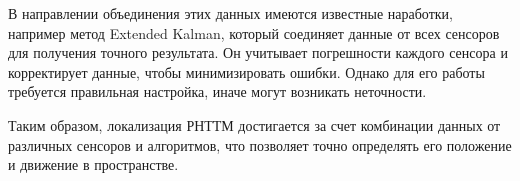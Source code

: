 В направлении объединения этих данных имеются известные наработки, например метод Extended Kalman, который соединяет данные от всех сенсоров для получения точного результата. Он учитывает погрешности каждого сенсора и корректирует данные, чтобы минимизировать ошибки. Однако для его работы требуется правильная настройка, иначе могут возникать неточности.

Таким образом, локализация РНТТМ достигается за счет комбинации данных от различных сенсоров и алгоритмов, что позволяет точно определять его положение и движение в пространстве.